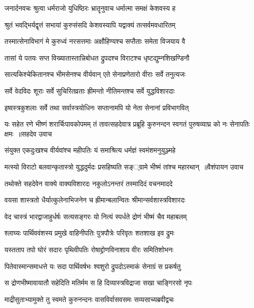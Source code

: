 \twolineshloka
{जनार्दनवचः श्रुत्वा धर्मराजो युधिष्ठिरः}
{भ्रातॄनुवाच धर्मात्मा समक्षं केशवस्य ह}


\twolineshloka
{श्रुतं भवद्भिर्यद्वृत्तं सभायां कुरुसंसदि}
{केशवस्यापि यद्वाक्यं तत्सर्वमवधारितम्}


\twolineshloka
{तस्मात्सेनाविभागं मे कुरुध्वं नरसत्तमाः}
{अक्षौहिण्यश्च सप्तैताः समेता विजयाय वै}


\twolineshloka
{तासां ये पतयः सप्त विख्यातास्तान्निबोधत}
{द्रुपदश्च विराटश्च धृष्टद्युम्नशिखण्डिनौ}


\twolineshloka
{सात्यकिश्चेकितानश्च भीमसेनश्च वीर्यवान्}
{एते सेनाप्रणेतारो वीराः सर्वे तनुत्यजः}


\twolineshloka
{सर्वे वेदविदः शूराः सर्वे सुचिरितव्रताः}
{ह्रीमन्तो नीतिमन्तश्च सर्वे युद्धविशारदाः}


\twolineshloka
{इष्वस्त्रकुशलाः सर्वे तथा सर्वास्त्रयोधिनः}
{सप्तानामपि यो नेता सेनानां प्रविभागवित्}


\fourlineindentedshloka
{यः सहेत रणे भीष्णं शरार्चिःपावकोपमम्}
{तं तावत्सहदेवात्र प्रब्रूहि कुरुनन्दन}
{स्वगतं पुरुषव्याघ्र को नः सेनापतिः क्षमः ॥सहदेव उवाच}
{}


\twolineshloka
{संयुक्त एकदुःखश्च वीर्यवांश्च महीपतिः}
{यं समाश्रित्य धर्मज्ञं स्वमंशमनुयुञ्ज्महे}


\threelineshloka
{मत्स्यो विराटो बलवान्कृतास्त्रो युद्धदुर्मदः}
{प्रसहिष्यति सङ््ग्रामे भीष्मं तांश्च महारथान् ॥वैशंपायन उवाच}
{}


\twolineshloka
{तथोक्ते सहदेवेन वाक्ये वाक्यविशारदः}
{नकुलोऽनन्तरं तस्मादिदं वचनमाददे}


\twolineshloka
{वयसा शास्त्रतो धैर्यात्कुलेनाभिजनेन च}
{ह्रीमान्बलान्वितः श्रीमान्सर्वशास्त्रविशारदः}


\twolineshloka
{वेद चास्त्रं भारद्वाजाहुर्धर्षः सत्यसङ्गरः}
{यो नित्यं स्पर्धते द्रोणं भीष्मं चैव महाबलम्}


\twolineshloka
{श्लाघ्यः पार्थिववंशस्य प्रमुखे वाहिनीपतिः}
{पुत्रपौत्रेः परिवृतः शतशाख इव द्रुमः}


\twolineshloka
{यस्तताप तपो घोरं सदारः पृथिवीपतिः}
{रोषाद्द्रोणविनाशाय वीरः समितिशोभनः}


\twolineshloka
{पितेवास्मान्समाधत्ते यः सदा पार्थिवर्षभः}
{श्वशुरो द्रुपदोऽस्माकं सेनाग्रं स प्रकर्षतु}


\twolineshloka
{स द्रोणभीष्मावायातौ सहेदिति मतिर्मम}
{स हि दिव्यास्त्रविद्राजा सखा चाङ्गिरसो नृपः}


\twolineshloka
{माद्रीसुताभ्यामुक्ते तु स्वमते कुरुनन्दनः}
{वासविर्वासवसमः सव्यसाच्यब्रवीद्वचः}


